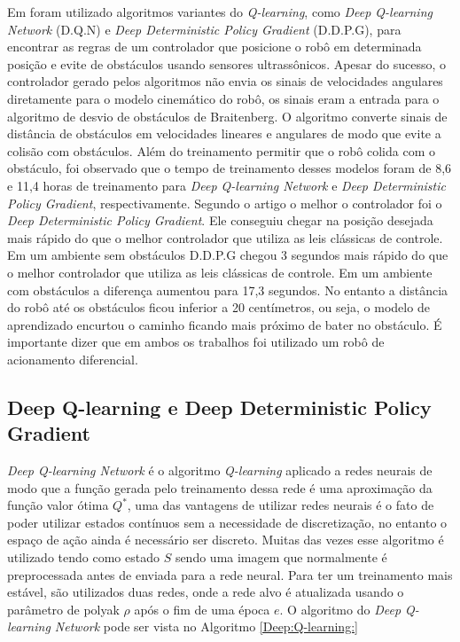 Em \cite{quiroga2022position}
foram utilizado algoritmos variantes do \textit{Q-learning},
como \textit{Deep Q-learning Network} (D.Q.N) e
\textit{Deep Deterministic Policy Gradient} (D.D.P.G),
para encontrar as
regras de um controlador que posicione o robô em determinada
posição e evite de obstáculos usando sensores ultrassônicos.
Apesar do sucesso, o controlador gerado pelos algoritmos não envia
os sinais de velocidades angulares diretamente para o modelo cinemático
do robô, os sinais eram a entrada para o algoritmo de desvio de obstáculos de Braitenberg.
O algoritmo converte sinais de distância de obstáculos em velocidades
lineares e angulares de modo que evite a colisão com obstáculos.
Além do treinamento permitir que o robô colida com o obstáculo, foi observado que o tempo de treinamento desses modelos
foram de 8,6 e 11,4 horas de treinamento para \textit{Deep Q-learning Network}
e \textit{Deep Deterministic Policy Gradient}, respectivamente.
Segundo o
artigo o melhor o controlador foi o \textit{Deep Deterministic Policy Gradient}.
Ele conseguiu chegar na posição desejada mais rápido do que o
melhor controlador que utiliza as leis clássicas de controle.
Em um ambiente sem obstáculos D.D.P.G chegou 3 segundos mais rápido
do que o melhor controlador que utiliza as leis clássicas de controle.
Em um ambiente com obstáculos a diferença aumentou para
17,3 segundos. No entanto a distância do robô até os obstáculos ficou
inferior a 20 centímetros, ou seja, o modelo de aprendizado encurtou o
caminho ficando mais próximo de bater no obstáculo. É importante dizer que
em ambos os trabalhos foi utilizado um robô de acionamento diferencial.

\subsection{Deep Q-learning e Deep Deterministic Policy Gradient }
\textit{Deep Q-learning Network} é o algoritmo \textit{Q-learning}
aplicado a redes neurais de modo que a função gerada pelo treinamento
dessa rede é uma aproximação da função valor ótima $Q^*$, uma das vantagens
de utilizar redes neurais é o fato de poder utilizar estados contínuos sem a
necessidade de discretização, no entanto o espaço de ação ainda é necessário
ser discreto. Muitas das vezes esse algoritmo é utilizado
tendo como estado $S$ sendo uma imagem que normalmente é preprocessada
antes de enviada para a rede neural. Para ter um treinamento mais estável,
são utilizados duas redes, onde a rede alvo é atualizada usando o parâmetro
de polyak $\rho$ após o fim de uma época $e$.
O algoritmo do \textit{Deep Q-learning Network}
pode ser vista no Algoritmo \ref{Deep:Q-learning:}


